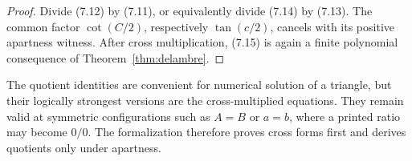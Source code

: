 \begin{proof}
Divide (7.12) by (7.11), or equivalently divide (7.14) by (7.13).  The common
factor \(\cot(C/2)\), respectively \(\tan(c/2)\), cancels with its positive
apartness witness.  After cross multiplication, (7.15) is again a finite
polynomial consequence of Theorem~\ref{thm:delambre}.
\end{proof}

\begin{remark}
The quotient identities are convenient for numerical solution of a triangle,
but their logically strongest versions are the cross-multiplied equations.
They remain valid at symmetric configurations such as \(A=B\) or \(a=b\),
where a printed ratio may become \(0/0\).  The formalization therefore proves
cross forms first and derives quotients only under apartness.
\end{remark}

